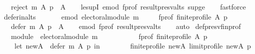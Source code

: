 \begin{isabellebody}
\ \ \ {\isachardoublequoteopen}reject\ m\ A\ p\ {\isasymsubseteq}\ A{\isachardoublequoteclose}\isanewline
%
\isadelimproof
\ \ %
\endisadelimproof
%
\isatagproof
{}\isamarkupfalse%
\ le{\isacharunderscore}{\kern0pt}supI{}\ e{\isacharunderscore}{\kern0pt}mod\ f{\isacharunderscore}{\kern0pt}prof\ result{\isacharunderscore}{\kern0pt}presv{\isacharunderscore}{\kern0pt}alts\ sup{\isacharunderscore}{\kern0pt}ge{}\isanewline
\ \ \isamarkupfalse%
\ fastforce%
\endisatagproof
{\isafoldproof}%
%
\isadelimproof
\isanewline
%
\endisadelimproof
\isanewline
{}\isamarkupfalse%
\ defer{\isacharunderscore}{\kern0pt}in{\isacharunderscore}{\kern0pt}alts{\isacharcolon}{\kern0pt}\isanewline
\ \ \isanewline
\ \ \ \ e{\isacharunderscore}{\kern0pt}mod{\isacharcolon}{\kern0pt}\ {\isachardoublequoteopen}electoral{\isacharunderscore}{\kern0pt}module\ m{\isachardoublequoteclose}\ \isanewline
\ \ \ \ f{\isacharunderscore}{\kern0pt}prof{\isacharcolon}{\kern0pt}\ {\isachardoublequoteopen}finite{\isacharunderscore}{\kern0pt}profile\ A\ p{\isachardoublequoteclose}\isanewline
\ \ \ {\isachardoublequoteopen}defer\ m\ A\ p\ {\isasymsubseteq}\ A{\isachardoublequoteclose}\isanewline
%
\isadelimproof
\ \ %
\endisadelimproof
%
\isatagproof
{}\isamarkupfalse%
\ e{\isacharunderscore}{\kern0pt}mod\ f{\isacharunderscore}{\kern0pt}prof\ result{\isacharunderscore}{\kern0pt}presv{\isacharunderscore}{\kern0pt}alts\isanewline
\ \ \isamarkupfalse%
\ auto%
\endisatagproof
{\isafoldproof}%
%
\isadelimproof
\isanewline
%
\endisadelimproof
\isanewline
{}\isamarkupfalse%
\ def{\isacharunderscore}{\kern0pt}presv{\isacharunderscore}{\kern0pt}fin{\isacharunderscore}{\kern0pt}prof{\isacharcolon}{\kern0pt}\isanewline
\ \ \ module{\isacharcolon}{\kern0pt}\ \ {\isachardoublequoteopen}electoral{\isacharunderscore}{\kern0pt}module\ m{\isachardoublequoteclose}\ \isanewline
\ \ \ \ \ \ \ \ \ \ f{\isacharunderscore}{\kern0pt}prof{\isacharcolon}{\kern0pt}\ {\isachardoublequoteopen}finite{\isacharunderscore}{\kern0pt}profile\ A\ p{\isachardoublequoteclose}\isanewline
\ \ \isanewline
\ \ \ \ {\isachardoublequoteopen}let\ new{\isacharunderscore}{\kern0pt}A\ {\isacharequal}{\kern0pt}\ defer\ m\ A\ p\ in\isanewline
\ \ \ \ \ \ \ \ finite{\isacharunderscore}{\kern0pt}profile\ new{\isacharunderscore}{\kern0pt}A\ {\isacharparenleft}{\kern0pt}limit{\isacharunderscore}{\kern0pt}profile\ new{\isacharunderscore}{\kern0pt}A\ p{\isacharparenright}{\kern0pt}{\isachardoublequoteclose}\isanewline

\end{isabellebody}
